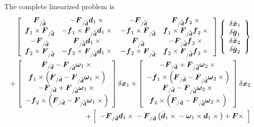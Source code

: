 \documentclass[10pt,dvips]{report}
\newcommand{\T}[1]{\boldsymbol{#1}}
\begin{document}
The complete linearized problem is
\begin{eqnarray*}
	\sqbr{\matr{cccc}{
		\T{F}_{/\dot{\tilde{\T{d}}}} & -\T{F}_{/\dot{\tilde{\T{d}}}} \T{d}_1\times{} &
			- \T{F}_{/\dot{\tilde{\T{d}}}} & \T{F}_{/\dot{\tilde{\T{d}}}} \T{f}_2\times{} \\
		\T{f}_1 \times \T{F}_{/\dot{\tilde{\T{d}}}} &
			- \T{f}_1 \times \T{F}_{/\dot{\tilde{\T{d}}}} \T{d}_1\times{} &
			- \T{f}_1 \times \T{F}_{/\dot{\tilde{\T{d}}}} &
			\T{f}_1 \times \T{F}_{/\dot{\tilde{\T{d}}}} \T{f}_2\times{} \\
		- \T{F}_{/\dot{\tilde{\T{d}}}} & \T{F}_{/\dot{\tilde{\T{d}}}} \T{d}_1\times{} &
			\T{F}_{/\dot{\tilde{\T{d}}}} & - \T{F}_{/\dot{\tilde{\T{d}}}} \T{f}_2\times{} \\
		\T{f}_2 \times \T{F}_{/\dot{\tilde{\T{d}}}} &
			- \T{f}_2 \times \T{F}_{/\dot{\tilde{\T{d}}}} \T{d}_1\times{} &
			- \T{f}_2 \times \T{F}_{/\dot{\tilde{\T{d}}}} &
			\T{f}_2 \times \T{F}_{/\dot{\tilde{\T{d}}}} \T{f}_2\times{}
	}} \cubr{\cvvect{
		\delta\dot{\T{x}}_1 \\
		\delta\dot{\T{g}}_1 \\
		\delta\dot{\T{x}}_2 \\
		\delta\dot{\T{g}}_2
	}} & & \\
	\mbox{} + \sqbr{\cvvect{
		\T{F}_{/\tilde{\T{d}}} - \T{F}_{/\dot{\tilde{\T{d}}}} \T{\omega}_1 \times{} \\
		\T{f}_1 \times \plbr{\T{F}_{/\tilde{\T{d}}} - \T{F}_{/\dot{\tilde{\T{d}}}} \T{\omega}_1 \times{}} \\
		- \T{F}_{/\tilde{\T{d}}} + \T{F}_{/\dot{\tilde{\T{d}}}} \T{\omega}_1 \times{} \\
		- \T{f}_2 \times \plbr{\T{F}_{/\tilde{\T{d}}} - \T{F}_{/\dot{\tilde{\T{d}}}} \T{\omega}_1 \times{}}
	}} \delta\T{x}_1 + \sqbr{\cvvect{
		- \T{F}_{/\tilde{\T{d}}} + \T{F}_{/\dot{\tilde{\T{d}}}} \T{\omega}_2 \times{} \\
		- \T{f}_1 \times \plbr{\T{F}_{/\tilde{\T{d}}} - \T{F}_{/\dot{\tilde{\T{d}}}} \T{\omega}_2 \times{}} \\
		\T{F}_{/\tilde{\T{d}}} - \T{F}_{/\dot{\tilde{\T{d}}}} \T{\omega}_2 \times{} \\
		\T{f}_2 \times \plbr{\T{F}_{/\tilde{\T{d}}} - \T{F}_{/\dot{\tilde{\T{d}}}} \T{\omega}_2 \times{}}
	}} \delta\T{x}_2 & & \\
	\mbox{} + \sqbr{\cvvect{
		- \T{F}_{/\tilde{\T{d}}} \T{d}_1 \times{}
		- \T{F}_{/\tilde{\T{d}}} \plbr{
			\dot{\T{d}}_1 \times{} - \T{\omega}_1 \times \T{d}_1\times{}
		} + \T{F}\times \\
}}
\end{eqnarray*}
\end{document}
